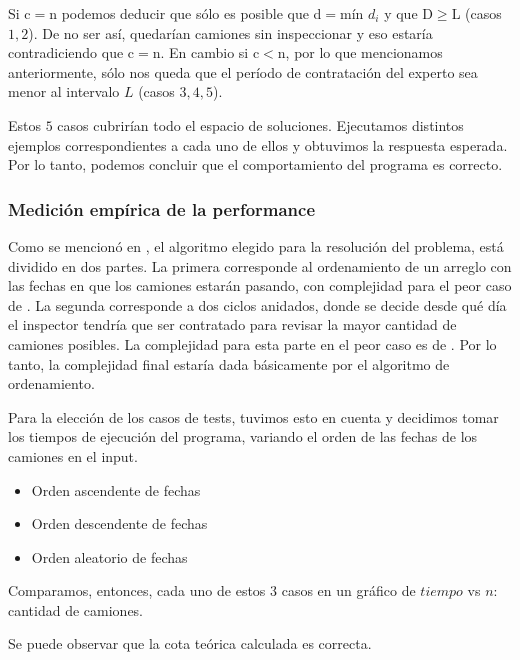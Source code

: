 \documentclass[11pt, a4paper, twoside]{article}
\begin{document}
Si c$=$n podemos deducir que sólo es posible que d$=$mín $d_i$ y que D$\ge$L
(casos $1,2$). De no ser así, quedarían camiones sin inspeccionar y eso estaría
contradiciendo que c$=$n. En cambio si c$<$n, por lo que mencionamos
anteriormente, sólo nos queda que el período de contratación del experto sea
menor al intervalo $L$ (casos $3,4,5$).


Estos $5$ casos cubrirían todo el espacio de soluciones. Ejecutamos distintos
ejemplos correspondientes a cada uno de ellos y obtuvimos la respuesta esperada.
Por lo tanto, podemos concluir que el comportamiento del programa es correcto.

\subsubsection{Medición empírica de la performance}

Como se mencionó en , el algoritmo elegido para la
resolución del problema, está dividido en dos partes. La primera corresponde al
ordenamiento de un arreglo con las fechas en que los camiones estarán pasando,
con complejidad para el peor caso de . La segunda corresponde a
dos ciclos anidados, donde se decide desde qué día el inspector tendría que ser
contratado para revisar la mayor cantidad de camiones posibles. La complejidad
para esta parte en el peor caso es de . Por lo tanto, la complejidad
final estaría dada básicamente por el algoritmo de ordenamiento.

Para la elección de los casos de tests, tuvimos esto en cuenta y decidimos tomar
los tiempos de ejecución del programa, variando el orden de las fechas de los
camiones en el input.

\begin{itemize}
  \item Orden ascendente de fechas
  \item Orden descendente de fechas
  \item Orden aleatorio de fechas
\end{itemize}     

Comparamos, entonces, cada uno de estos $3$ casos en un gráfico de $tiempo$ vs $n$: cantidad de camiones. 

Se puede observar que la cota teórica calculada es correcta.
\end{document}
